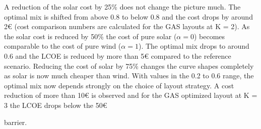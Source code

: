 \documentclass[a4paper, 5p, sort&compress]{elsarticle}%
\begin{document}
A reduction of the solar cost by 25\% does not change the picture
much. The optimal mix is shifted from above 0.8 to below 0.8 and the
cost drops by around 2\euro{}
(cost comparison numbers are calculated for the GAS layouts at K = 2).
As the solar cost is reduced by 50\% the cost of pure solar
($\alpha=0$) becomes comparable to the cost of pure wind ($\alpha=1$). The
optimal mix drops to around 0.6 and the LCOE is reduced by more than
5\euro{}
compared to the reference scenario. Reducing the cost of solar by 75\%
changes the curve shapes completely as solar is now much cheaper than
wind. With values in the 0.2 to 0.6 range, the optimal mix now depends
strongly on the choice of layout strategy. A cost reduction of more
than 10\euro{}
is observed and for the GAS optimized layout at K = 3 the LCOE drops
below the 50\euro{{} barrier.




}
\end{document}
